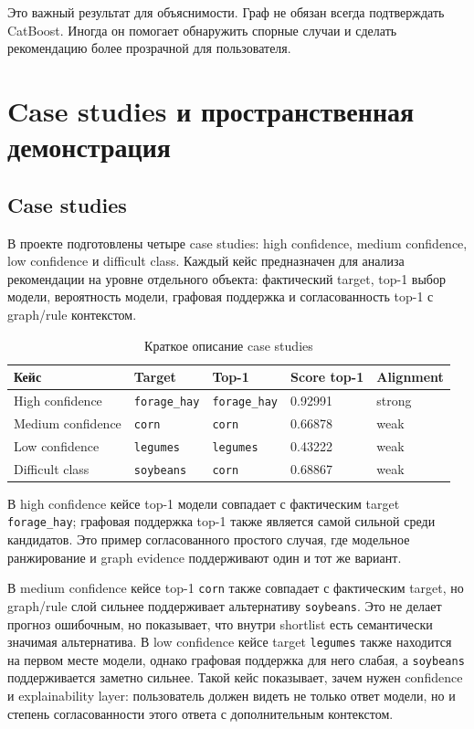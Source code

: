 \documentclass[a4paper,article,14pt]{extarticle}
\begin{document}
Это важный результат для объяснимости. Граф не обязан всегда подтверждать CatBoost. Иногда он помогает обнаружить спорные случаи и сделать рекомендацию более прозрачной для пользователя.

\section{Case studies и пространственная демонстрация}

\subsection{Case studies}

В проекте подготовлены четыре case studies: high confidence, medium confidence, low confidence и difficult class. Каждый кейс предназначен для анализа рекомендации на уровне отдельного объекта: фактический target, top-1 выбор модели, вероятность модели, графовая поддержка и согласованность top-1 с graph/rule контекстом.

\begin{center}
\begin{longtable}{|p{3.8cm}|p{2.2cm}|p{2.2cm}|p{2.2cm}|p{2.8cm}|}
\caption{Краткое описание case studies}\\
\hline
Кейс & Target & Top-1 & Score top-1 & Alignment\\
\hline
High confidence & \texttt{forage\_hay} & \texttt{forage\_hay} & 0.92991 & strong\\
\hline
Medium confidence & \texttt{corn} & \texttt{corn} & 0.66878 & weak\\
\hline
Low confidence & \texttt{legumes} & \texttt{legumes} & 0.43222 & weak\\
\hline
Difficult class & \texttt{soybeans} & \texttt{corn} & 0.68867 & weak\\
\hline
\end{longtable}
\end{center}

В high confidence кейсе top-1 модели совпадает с фактическим target \texttt{forage\_hay}; графовая поддержка top-1 также является самой сильной среди кандидатов. Это пример согласованного простого случая, где модельное ранжирование и graph evidence поддерживают один и тот же вариант.

В medium confidence кейсе top-1 \texttt{corn} также совпадает с фактическим target, но graph/rule слой сильнее поддерживает альтернативу \texttt{soybeans}. Это не делает прогноз ошибочным, но показывает, что внутри shortlist есть семантически значимая альтернатива. В low confidence кейсе target \texttt{legumes} также находится на первом месте модели, однако графовая поддержка для него слабая, а \texttt{soybeans} поддерживается заметно сильнее. Такой кейс показывает, зачем нужен confidence и explainability layer: пользователь должен видеть не только ответ модели, но и степень согласованности этого ответа с дополнительным контекстом.
\end{document}
